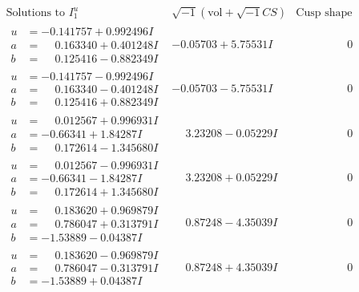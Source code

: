 \documentclass[1p]{elsarticle_modified}
\theoremstyle{definition}
\newcommand{\I}{\sqrt{-1}}
\begin{document}
$$\begin{array}{c|c|c}  
\text{Solutions to }I^u_{1}& \I (\text{vol} + \sqrt{-1}CS) & \text{Cusp shape}\\
 \hline 
\begin{aligned}
u &= -0.141757 + 0.992496 I \\
a &= \phantom{-}0.163340 + 0.401248 I \\
b &= \phantom{-}0.125416 - 0.882349 I\end{aligned}
 & -0.05703 + 5.75531 I & \phantom{-0.000000 } 0 \\ \hline\begin{aligned}
u &= -0.141757 - 0.992496 I \\
a &= \phantom{-}0.163340 - 0.401248 I \\
b &= \phantom{-}0.125416 + 0.882349 I\end{aligned}
 & -0.05703 - 5.75531 I & \phantom{-0.000000 } 0 \\ \hline\begin{aligned}
u &= \phantom{-}0.012567 + 0.996931 I \\
a &= -0.66341 + 1.84287 I \\
b &= \phantom{-}0.172614 - 1.345680 I\end{aligned}
 & \phantom{-}3.23208 - 0.05229 I & \phantom{-0.000000 } 0 \\ \hline\begin{aligned}
u &= \phantom{-}0.012567 - 0.996931 I \\
a &= -0.66341 - 1.84287 I \\
b &= \phantom{-}0.172614 + 1.345680 I\end{aligned}
 & \phantom{-}3.23208 + 0.05229 I & \phantom{-0.000000 } 0 \\ \hline\begin{aligned}
u &= \phantom{-}0.183620 + 0.969879 I \\
a &= \phantom{-}0.786047 + 0.313791 I \\
b &= -1.53889 - 0.04387 I\end{aligned}
 & \phantom{-}0.87248 - 4.35039 I & \phantom{-0.000000 } 0 \\ \hline\begin{aligned}
u &= \phantom{-}0.183620 - 0.969879 I \\
a &= \phantom{-}0.786047 - 0.313791 I \\
b &= -1.53889 + 0.04387 I\end{aligned}
 & \phantom{-}0.87248 + 4.35039 I & \phantom{-0.000000 } 0 \\ \hline\begin{aligned}

\end{aligned}
\end{array}$$
\end{document}
